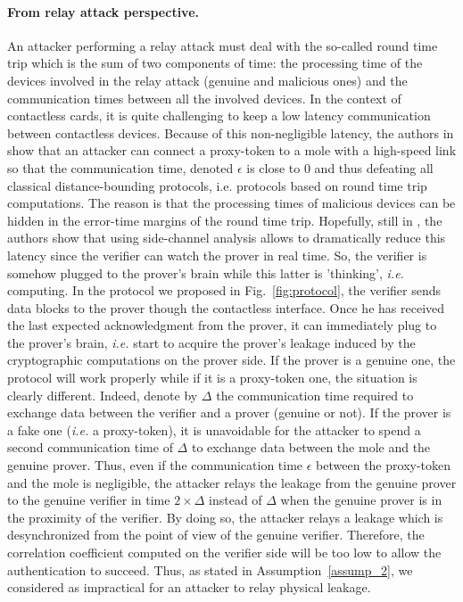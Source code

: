 \documentclass{llncs}
\begin{document}
\paragraph{From relay attack perspective.}
An attacker performing a relay attack must deal with the so-called round time trip which is the sum of two components of time: the processing time of the devices involved in the relay attack (genuine and malicious ones) and the communication times between all the involved devices. In the context of contactless cards, it is quite challenging to keep a low latency communication between contactless devices. Because of this non-negligible latency, the authors in \cite{DBLP:conf/ccs/ReidNTS07} show that an attacker can connect a proxy-token to a mole with a high-speed link so that the communication time, denoted $\epsilon$ is close to $0$ and thus defeating all classical distance-bounding protocols, i.e. protocols based on round time trip computations. The reason is that the processing times of malicious devices can be hidden in the error-time margins of the round time trip.
Hopefully, still in \cite{DBLP:conf/ccs/ReidNTS07}, the authors show that using side-channel analysis allows to dramatically reduce this latency since the verifier can watch the prover in real time. So, the verifier is somehow plugged to the prover's brain while this latter is 'thinking', \emph{i.e.} computing.
In the protocol we proposed in Fig.~\ref{fig:protocol}, the verifier sends data blocks to the prover though the contactless interface. Once he has received the last expected acknowledgment from the prover, it can immediately plug to the prover's brain, \emph{i.e.} start to acquire the prover's leakage induced by the cryptographic computations on the prover side. If the prover is a genuine one, the protocol will work properly while if it is a proxy-token one, the situation is clearly different. Indeed, denote by $\Delta$ the communication time required to exchange data between the verifier and a prover (genuine or not). If the prover is a fake one (\emph{i.e.} a proxy-token), it is unavoidable for the attacker to spend a second communication time of $\Delta$ to exchange data between the mole and the genuine prover. Thus, even if the communication time $\epsilon$ between the proxy-token and the mole is negligible, the attacker relays the leakage from the genuine prover to the genuine verifier in time $2  \times\Delta$ instead of $\Delta$ when the genuine prover is in the proximity of the verifier. By doing so, the attacker relays a leakage which is desynchronized from the point of view of the genuine verifier. Therefore, the correlation coefficient computed on the verifier side will be too low to allow the authentication to succeed. Thus, as stated in Assumption~\ref{assump_2}, we considered as impractical for an attacker to relay physical leakage.
\end{document}
